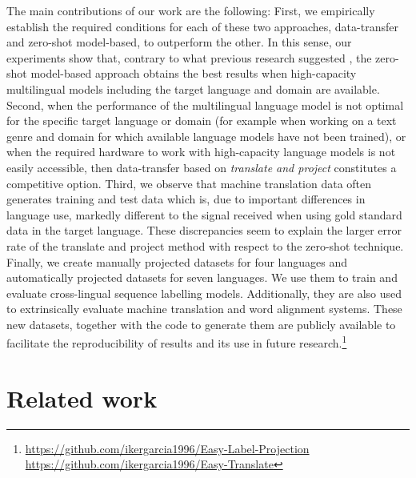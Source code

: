 \documentclass[11pt]{article}
\begin{document}
The main contributions of our work are the following: First, we empirically establish the required conditions for each of these two approaches, data-transfer and zero-shot model-based, to outperform the other. In this sense, our experiments show that, contrary to what previous research suggested \cite{fei-etal-2020-cross,Li2021crosslingualNE}, the zero-shot model-based approach obtains the best results when high-capacity multilingual models including the target language and domain are available. Second, when the performance of the multilingual language model is not optimal for the specific target language or domain (for example when working on a text genre and domain for which available language models have not been trained), or when the required hardware to work with high-capacity language models is not easily accessible, then data-transfer based on \emph{translate and project} constitutes a competitive option. Third, we observe that machine translation data often generates training and test data which is, due to important differences in language use, markedly different to the signal received when using gold standard data in the target language. These discrepancies seem to explain the larger error rate of the translate and project method with respect to the zero-shot technique. Finally, we create manually projected datasets for four languages and automatically projected datasets for seven languages. We use them to train and evaluate cross-lingual sequence labelling models. Additionally, they are also used to extrinsically evaluate machine translation and word alignment systems. These new datasets, together with the code to generate them are publicly available to facilitate the reproducibility of results and its use in future research.\footnote{\url{https://github.com/ikergarcia1996/Easy-Label-Projection} \\ \url{https://github.com/ikergarcia1996/Easy-Translate}}
















\section{Related work}
\label{sec:RelatedWord}
\end{document}
